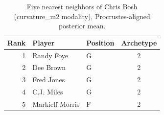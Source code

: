 \begin{table}[htbp]
  \centering\small
  \begin{tabular}{rllc}
    \toprule
    Rank & Player & Position & Archetype \\
    \midrule
    1 & Randy Foye & G & 2 \\
    2 & Dee Brown & G & 2 \\
    3 & Fred Jones & G & 2 \\
    4 & C.J. Miles & G & 2 \\
    5 & Markieff Morris & F & 2 \\
    \bottomrule
  \end{tabular}
  \caption{Five nearest neighbors of Chris Bosh (curvature_m2 modality), Procrustes-aligned posterior mean.}
  \label{tab:Chris_Bosh_neighbors_curvature_m2}
\end{table}

